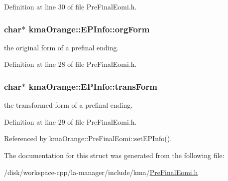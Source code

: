 Definition at line 30 of file PreFinalEomi.h.\hypertarget{structkmaOrange_1_1EPInfo_2a8a601311d6bc7a80c0d43a9e515823}{
\subsubsection[{orgForm}]{\setlength{\rightskip}{0pt plus 5cm}char$\ast$ {\bf kmaOrange::EPInfo::orgForm}}}
\label{structkmaOrange_1_1EPInfo_2a8a601311d6bc7a80c0d43a9e515823}


the original form of a prefinal ending. 



Definition at line 28 of file PreFinalEomi.h.\hypertarget{structkmaOrange_1_1EPInfo_c2ad8a4ce555531304f4a6836bb2d5ff}{
\subsubsection[{transForm}]{\setlength{\rightskip}{0pt plus 5cm}char$\ast$ {\bf kmaOrange::EPInfo::transForm}}}
\label{structkmaOrange_1_1EPInfo_c2ad8a4ce555531304f4a6836bb2d5ff}


the transformed form of a prefinal ending. 



Definition at line 29 of file PreFinalEomi.h.

Referenced by kmaOrange::PreFinalEomi::setEPInfo().

The documentation for this struct was generated from the following file:\begin{CompactItemize}
\item 
/disk/workspace-cpp/la-manager/include/kma/\hyperlink{PreFinalEomi_8h}{PreFinalEomi.h}\end{CompactItemize}

